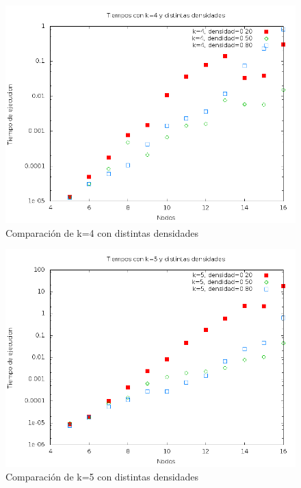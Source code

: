 \begin{figure}[H]
	\begin{center}
		\includegraphics[scale=0.4]{ej2/k_4.png}
	\end{center}
	\caption{Comparaci\'on de k=4 con distintas densidades}
	\label{ej2_k_4}
\end{figure}

\begin{figure}[H]
	\begin{center}
		\includegraphics[scale=0.4]{ej2/k_5.png}
	\end{center}
	\caption{Comparaci\'on de k=5 con distintas densidades}
	\label{ej2_k_5}
\end{figure}

